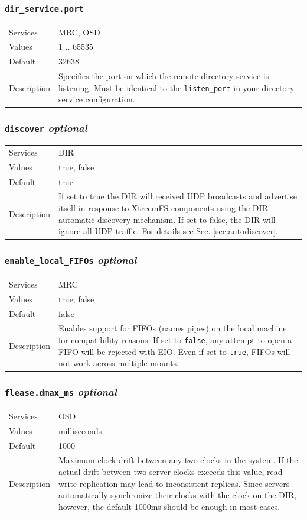 \documentclass[a4paper,10pt]{book}
\begin{document}
\subsubsection{\texttt{dir\_service.port}}
\begin{tabular}{lp{10cm}}
 Services & MRC, OSD\\
 Values   & 1 .. 65535 \\
 Default  & 32638 \\
 Description & Specifies the port on which the remote directory service is listening. Must be identical to the \texttt{listen\_port} in your directory service configuration.
\end{tabular}

\subsubsection{\texttt{discover} \textit{optional}}
\begin{tabular}{lp{10cm}}
 Services & DIR\\
 Values   & true, false \\
 Default  & true \\
 Description & If set to true the DIR will received UDP broadcasts and advertise itself in response to XtreemFS components using the DIR automatic discovery mechanism. If set to false, the DIR will ignore all UDP traffic. For details see Sec. \ref{sec:autodiscover}.
\end{tabular}

\subsubsection{\texttt{enable\_local\_FIFOs} \textit{optional}}
\begin{tabular}{lp{10cm}}
 Services & MRC\\
 Values   & true, false \\
 Default  & false\\
 Description & Enables support for FIFOs (names pipes) on the local machine for compatibility reasons. If set to \texttt{false}, any attempt to open a FIFO will be rejected with EIO. Even if set to \texttt{true}, FIFOs will not work across multiple mounts.
\end{tabular}

\subsubsection{\texttt{flease.dmax\_ms} \textit{optional}}
\begin{tabular}{lp{10cm}}
 Services & OSD\\
 Values   & milliseconds \\
 Default  & 1000 \\
 Description & Maximum clock drift between any two clocks in the system. If the actual drift between two server clocks exceeds this value, read-write replication may lead to inconsistent replicas. Since servers automatically synchronize their clocks with the clock on the DIR, however, the default 1000ms should be enough in most cases.
\end{tabular}
\end{document}
